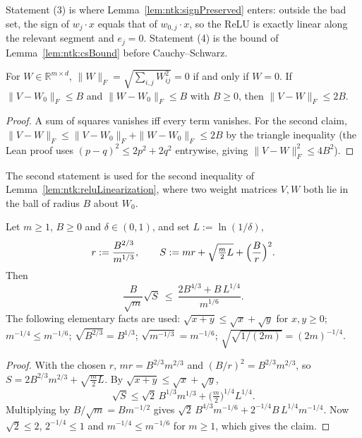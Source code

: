 Statement (3) is where Lemma~\ref{lem:ntk:signPreserved} enters: outside the bad set, the sign of $w_j\cdot x$ equals that of $w_{0,j}\cdot x$, so the ReLU is exactly linear along the relevant segment and $e_j=0$. Statement (4) is the bound of Lemma~\ref{lem:ntk:csBound} before Cauchy--Schwarz.

\begin{lemma}\label{lem:ntkhelp:frob}
  \leanok
For $W\in\mathbb R^{m\times d}$, $\|W\|_F=\sqrt{\sum_{i,j}W_{ij}^2}=0$ if and only if $W=0$. If $\|V-W_0\|_F\le B$ and $\|W-W_0\|_F\le B$ with $B\ge0$, then $\|V-W\|_F\le2B$.
\end{lemma}

\begin{proof}
  \leanok
A sum of squares vanishes iff every term vanishes. For the second claim, $\|V-W\|_F\le\|V-W_0\|_F+\|W-W_0\|_F\le2B$ by the triangle inequality (the Lean proof uses $(p-q)^2\le2p^2+2q^2$ entrywise, giving $\|V-W\|_F^2\le4B^2$).
\end{proof}

The second statement is used for the second inequality of Lemma~\ref{lem:ntk:reluLinearization}, where two weight matrices $V,W$ both lie in the ball of radius $B$ about $W_0$.

\begin{lemma}\label{lem:ntkhelp:arithmetic}
  \leanok
Let $m\ge1$, $B\ge0$ and $\delta\in(0,1)$, and set $L:=\ln(1/\delta)$,
\[
  r:=\frac{B^{2/3}}{m^{1/3}},\qquad S:=mr+\sqrt{\tfrac m2L}+\Bigl(\frac Br\Bigr)^2 .
\]
Then
\[
  \frac B{\sqrt m}\sqrt S\ \le\ \frac{2B^{4/3}+B\,L^{1/4}}{m^{1/6}} .
\]
The following elementary facts are used: $\sqrt{x+y}\le\sqrt x+\sqrt y$ for $x,y\ge0$; $m^{-1/4}\le m^{-1/6}$; $\sqrt{B^{2/3}}=B^{1/3}$; $\sqrt{m^{-1/3}}=m^{-1/6}$; $\sqrt{\sqrt{1/(2m)}}=(2m)^{-1/4}$.
\end{lemma}

\begin{proof}
  \leanok
With the chosen $r$, $mr=B^{2/3}m^{2/3}$ and $(B/r)^2=B^{2/3}m^{2/3}$, so $S=2B^{2/3}m^{2/3}+\sqrt{\tfrac m2L}$. By $\sqrt{x+y}\le\sqrt x+\sqrt y$,
\[
  \sqrt S\le\sqrt2\,B^{1/3}m^{1/3}+\bigl(\tfrac m2\bigr)^{1/4}L^{1/4}.
\]
Multiplying by $B/\sqrt m=Bm^{-1/2}$ gives $\sqrt2\,B^{4/3}m^{-1/6}+2^{-1/4}B\,L^{1/4}m^{-1/4}$. Now $\sqrt2\le2$, $2^{-1/4}\le1$ and $m^{-1/4}\le m^{-1/6}$ for $m\ge1$, which gives the claim.
\end{proof}

